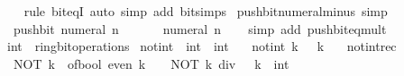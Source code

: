 \begin{isabellebody}
%
\isadelimproof
\ \ %
\endisadelimproof
%
\isatagproof
{}\isamarkupfalse%
\ {\isacharparenleft}{\kern0pt}rule\ bit{\isacharunderscore}{\kern0pt}eqI{\isacharparenright}{\kern0pt}\ {\isacharparenleft}{\kern0pt}auto\ simp\ add{\isacharcolon}{\kern0pt}\ bit{\isacharunderscore}{\kern0pt}simps{\isacharparenright}{\kern0pt}%
\endisatagproof
{\isafoldproof}%
%
\isadelimproof
\isanewline
%
\endisadelimproof
\isanewline
{}\isamarkupfalse%
\ push{\isacharunderscore}{\kern0pt}bit{\isacharunderscore}{\kern0pt}numeral{\isacharunderscore}{\kern0pt}minus{\isacharunderscore}{\kern0pt}{}\ {\isacharbrackleft}{\kern0pt}simp{\isacharbrackright}{\kern0pt}{\isacharcolon}{\kern0pt}\isanewline
\ \ {\isacartoucheopen}push{\isacharunderscore}{\kern0pt}bit\ {\isacharparenleft}{\kern0pt}numeral\ n{\isacharparenright}{\kern0pt}\ {\isacharparenleft}{\kern0pt}{\isacharminus}{\kern0pt}\ {}{\isacharparenright}{\kern0pt}\ {\isacharequal}{\kern0pt}\ {\isacharminus}{\kern0pt}\ {\isacharparenleft}{\kern0pt}{}\ {\isacharcircum}{\kern0pt}\ numeral\ n{\isacharparenright}{\kern0pt}{\isacartoucheclose}\isanewline
%
\isadelimproof
\ \ %
\endisadelimproof
%
\isatagproof
{}\isamarkupfalse%
\ {\isacharparenleft}{\kern0pt}simp\ add{\isacharcolon}{\kern0pt}\ push{\isacharunderscore}{\kern0pt}bit{\isacharunderscore}{\kern0pt}eq{\isacharunderscore}{\kern0pt}mult{\isacharparenright}{\kern0pt}%
\endisatagproof
{\isafoldproof}%
%
\isadelimproof
\isanewline
%
\endisadelimproof
\isanewline
{}\isamarkupfalse%
%
\isadelimdocument
%
\endisadelimdocument
%
\isatagdocument
%
\isamarkuptrue%
%
\endisatagdocument
{\isafolddocument}%
%
\isadelimdocument
%
\endisadelimdocument
{}\isamarkupfalse%
\ int\ {\isacharcolon}{\kern0pt}{\isacharcolon}{\kern0pt}\ ring{\isacharunderscore}{\kern0pt}bit{\isacharunderscore}{\kern0pt}operations\isanewline
{}\isanewline
\isanewline
{}\isamarkupfalse%
\ not{\isacharunderscore}{\kern0pt}int\ {\isacharcolon}{\kern0pt}{\isacharcolon}{\kern0pt}\ {\isacartoucheopen}int\ {\isasymRightarrow}\ int{\isacartoucheclose}\isanewline
\ \ \ {\isacartoucheopen}not{\isacharunderscore}{\kern0pt}int\ k\ {\isacharequal}{\kern0pt}\ {\isacharminus}{\kern0pt}\ k\ {\isacharminus}{\kern0pt}\ {}{\isacartoucheclose}\isanewline
\isanewline
{}\isamarkupfalse%
\ not{\isacharunderscore}{\kern0pt}int{\isacharunderscore}{\kern0pt}rec{\isacharcolon}{\kern0pt}\isanewline
\ \ {\isacartoucheopen}NOT\ k\ {\isacharequal}{\kern0pt}\ of{\isacharunderscore}{\kern0pt}bool\ {\isacharparenleft}{\kern0pt}even\ k{\isacharparenright}{\kern0pt}\ {\isacharplus}{\kern0pt}\ {}\ {\isacharasterisk}{\kern0pt}\ NOT\ {\isacharparenleft}{\kern0pt}k\ div\ {}{\isacharparenright}{\kern0pt}{\isacartoucheclose}\ \ k\ {\isacharcolon}{\kern0pt}{\isacharcolon}{\kern0pt}\ int\isanewline

\end{isabellebody}
